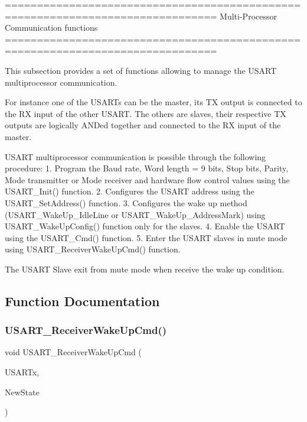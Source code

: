 \begin{DoxyVerb} ===============================================================================
                    Multi-Processor Communication functions
 ===============================================================================  

  This subsection provides a set of functions allowing to manage the USART 
  multiprocessor communication.
  
  For instance one of the USARTs can be the master, its TX output is connected to 
  the RX input of the other USART. The others are slaves, their respective TX outputs 
  are logically ANDed together and connected to the RX input of the master.

  USART multiprocessor communication is possible through the following procedure:
     1. Program the Baud rate, Word length = 9 bits, Stop bits, Parity, Mode transmitter 
        or Mode receiver and hardware flow control values using the USART_Init()
        function.
     2. Configures the USART address using the USART_SetAddress() function.
     3. Configures the wake up method (USART_WakeUp_IdleLine or USART_WakeUp_AddressMark)
        using USART_WakeUpConfig() function only for the slaves.
     4. Enable the USART using the USART_Cmd() function.
     5. Enter the USART slaves in mute mode using USART_ReceiverWakeUpCmd() function.

  The USART Slave exit from mute mode when receive the wake up condition.\end{DoxyVerb}
 

\subsection{Function Documentation}
\mbox{\label{group__USART__Group3_gac27b78ce445a16fe33851d2f87781c02}} 
\subsubsection{U\+S\+A\+R\+T\+\_\+\+Receiver\+Wake\+Up\+Cmd()}
{\footnotesize\ttfamily void U\+S\+A\+R\+T\+\_\+\+Receiver\+Wake\+Up\+Cmd (\begin{DoxyParamCaption}\item[{\textbf{ U\+S\+A\+R\+T\+\_\+\+Type\+Def} $\ast$}]{U\+S\+A\+R\+Tx,  }\item[{\textbf{ Functional\+State}}]{New\+State }\end{DoxyParamCaption})}



